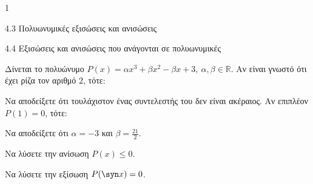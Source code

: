 \begin{ylh}{1}
\item 4.3 Πολυωνυμικές εξισώσεις και ανισώσεις
\item 4.4 Εξισώσεις και ανισώσεις που ανάγονται σε πολυωνυμικές
\end{ylh}
Δίνεται το πολυώνυμο $P(x) = \alpha x^3 + \beta x^2 - \beta x + 3, \ \alpha, \beta \in \mathbb{R}$. Αν είναι γνωστό ότι έχει ρίζα τον αριθμό $2$, τότε:
\begin{alist}
\item Να αποδείξετε ότι τουλάχιστον ένας συντελεστής του δεν είναι ακέραιος.
Αν επιπλέον $P(1) = 0$, τότε:
\item Να αποδείξετε ότι $\alpha = -3$ και $\beta = \frac{21}{2}$.
\item Να λύσετε την ανίσωση $P(x) \le 0$.
\item Να λύσετε την εξίσωση $P(\syn  x) = 0$.
\end{alist}

